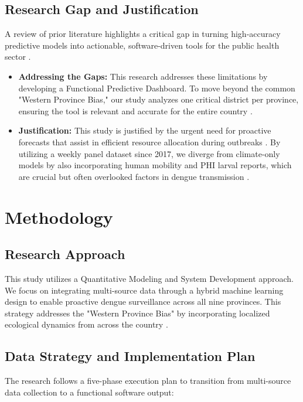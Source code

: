 ﻿\documentclass[12pt,a4paper]{article}
\begin{document}
\subsection{Research Gap and Justification}
A review of prior literature highlights a critical gap in turning high-accuracy predictive models into actionable, software-driven tools for the public health sector \parencite{wickramathilaka2024}.

\begin{itemize}
    \item \textbf{Addressing the Gaps:} This research addresses these limitations by developing a Functional Predictive Dashboard. To move beyond the common "Western Province Bias," our study analyzes one critical district per province, ensuring the tool is relevant and accurate for the entire country \parencite{fernando2024}.
    \item \textbf{Justification:} This study is justified by the urgent need for proactive forecasts that assist in efficient resource allocation during outbreaks \parencite{rahulan2024}. By utilizing a weekly panel dataset since 2017, we diverge from climate-only models by also incorporating human mobility and PHI larval reports, which are crucial but often overlooked factors in dengue transmission \parencite{delaguila2024}.
\end{itemize}

\section{Methodology}

\subsection{Research Approach}
This study utilizes a Quantitative Modeling and System Development approach. We focus on integrating multi-source data through a hybrid machine learning design to enable proactive dengue surveillance across all nine provinces. This strategy addresses the "Western Province Bias" by incorporating localized ecological dynamics from across the country \parencite{fernando2024}.

\subsection{Data Strategy and Implementation Plan}
The research follows a five-phase execution plan to transition from multi-source data collection to a functional software output:
\end{document}

